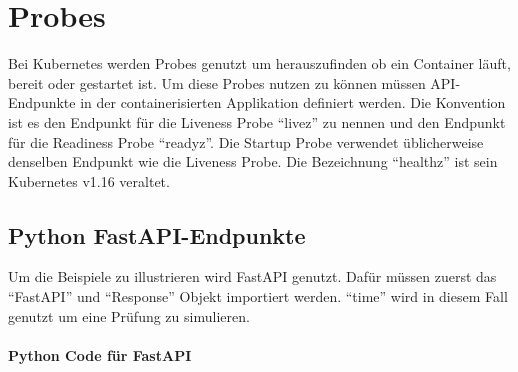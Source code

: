 \chapter{Probes}
Bei Kubernetes werden Probes genutzt um herauszufinden ob ein Container läuft, bereit oder gestartet ist. Um diese Probes nutzen zu können müssen API-Endpunkte in der containerisierten Applikation definiert werden.
Die Konvention ist es den Endpunkt für die Liveness Probe \enquote{livez} zu nennen und den Endpunkt für die Readiness Probe \enquote{readyz}.
Die Startup Probe verwendet üblicherweise denselben Endpunkt wie die Liveness Probe. Die Bezeichnung \enquote{healthz} ist sein Kubernetes v1.16 veraltet.
\section{Python FastAPI-Endpunkte}
Um die Beispiele zu illustrieren wird FastAPI genutzt. Dafür müssen zuerst das \enquote{FastAPI} und \enquote{Response} Objekt importiert werden. \enquote{time} wird in diesem Fall genutzt um eine Prüfung zu simulieren.
\subsubsection{Python Code für FastAPI}


